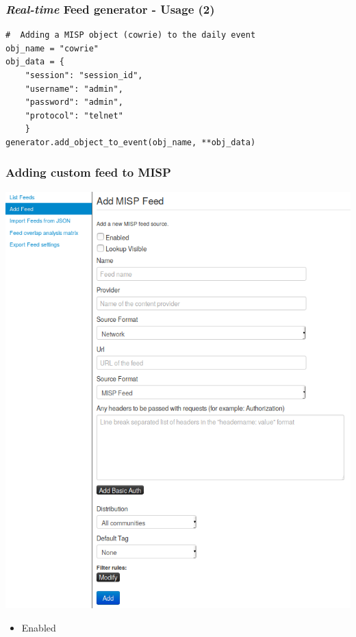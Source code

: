 \begin{frame}[fragile]
        \frametitle{{\it Real-time} Feed generator - Usage (2)}

    \begin{lstlisting}
#  Adding a MISP object (cowrie) to the daily event
obj_name = "cowrie"
obj_data = { 
    "session": "session_id", 
    "username": "admin", 
    "password": "admin", 
    "protocol": "telnet"
    }
generator.add_object_to_event(obj_name, **obj_data)
\end{lstlisting}
\end{frame}

\begin{frame}
    \frametitle{Adding custom feed to MISP}
        \begin{minipage}{0.48\linewidth}
            \includegraphics[width=1.0\linewidth]{pics/feeds3.png}
        \end{minipage}
        \hfill
        \begin{minipage}{0.48\linewidth}
            \begin{itemize}
                \item Enabled

\end{itemize}
\end{minipage}
\end{frame}
